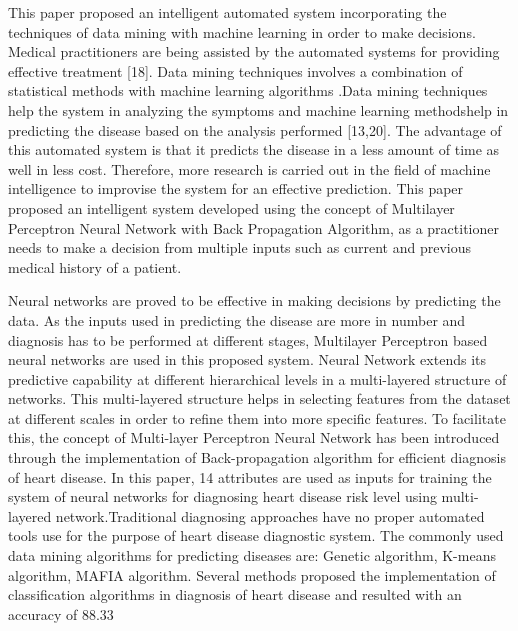 This paper proposed an intelligent automated system incorporating  the  techniques of data mining with machine learning in order to make decisions. Medical practitioners are being assisted by  the  automated  systems  for  providing effective  treatment  [18].  Data  mining  techniques  involves  a combination  of  statistical  methods  with  machine  learning algorithms  .Data  mining  techniques  help  the  system  in analyzing the symptoms and machine learning methodshelp in  predicting  the  disease  based  on  the  analysis  performed [13,20].  The  advantage  of  this  automated  system  is  that  it predicts the  disease  in  a  less  amount  of  time as  well  in less cost.  Therefore,  more  research  is  carried  out  in  the  field  of machine   intelligence   to   improvise   the   system   for   an effective   prediction.   This   paper   proposed   an   intelligent system    developed    using    the    concept    of    Multilayer Perceptron Neural Network with Back Propagation Algorithm,  as a practitioner  needs  to  make  a  decision  from multiple inputs such as current and previous medical history of  a  patient.  \par Neural  networks  are  proved  to  be  effective  in making decisions by predicting the data. As the inputs used in  predicting  the  disease  are  more  in  number  and  diagnosis has to be performed at different stages, Multilayer Perceptron  based  neural networks  are  used  in this  proposed system.  Neural  Network  extends  its  predictive  capability  at different  hierarchical  levels  in  a  multi-layered  structure  of networks.  This  multi-layered  structure helps  in  selecting features from the dataset at different scales in order to refine them  into  more  specific  features.  To  facilitate  this,  the concept of Multi-layer Perceptron Neural Network has been introduced through the implementation of Back-propagation algorithm  for  efficient  diagnosis  of  heart  disease.  In  this paper, 14 attributes are used as inputs for training the system of  neural  networks  for  diagnosing  heart  disease  risk  level using multi-layered network.Traditional   diagnosing   approaches   have   no proper automated   tools   use   for   the   purpose   of   heart   disease diagnostic   system.   The   commonly   used   data   mining algorithms for predicting diseases are: Genetic algorithm, K-means algorithm, MAFIA algorithm. Several methods proposed the implementation of classification  algorithms  in  diagnosis  of  heart  disease  and resulted with an accuracy of 88.33%





